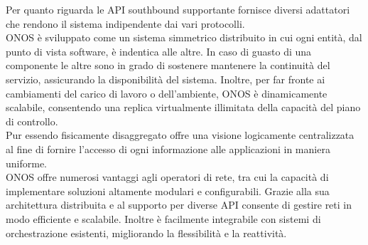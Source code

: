 Per quanto riguarda le API southbound supportante fornisce diversi adattatori che rendono il sistema indipendente dai vari protocolli.
\\ONOS è sviluppato come un sistema simmetrico distribuito in cui ogni entità, dal punto di vista software, è indentica alle altre. 
In caso di guasto di una componente le altre sono in grado di sostenere mantenere la continuità del servizio, assicurando la disponibilità del sistema. Inoltre, per far fronte ai cambiamenti del carico di lavoro o dell'ambiente, ONOS è dinamicamente scalabile, 
consentendo una replica virtualmente illimitata della capacità del piano di controllo.
\\Pur essendo fisicamente disaggregato offre una visione logicamente centralizzata al fine di fornire l'accesso di ogni informazione alle applicazioni in maniera uniforme.
\\ONOS offre numerosi vantaggi agli operatori di rete, tra cui la capacità di implementare soluzioni altamente modulari e configurabili. 
Grazie alla sua architettura distribuita e al supporto per diverse API consente di gestire reti in modo efficiente e scalabile.
Inoltre è facilmente integrabile con sistemi di orchestrazione esistenti, migliorando la flessibilità e la 
reattività.



